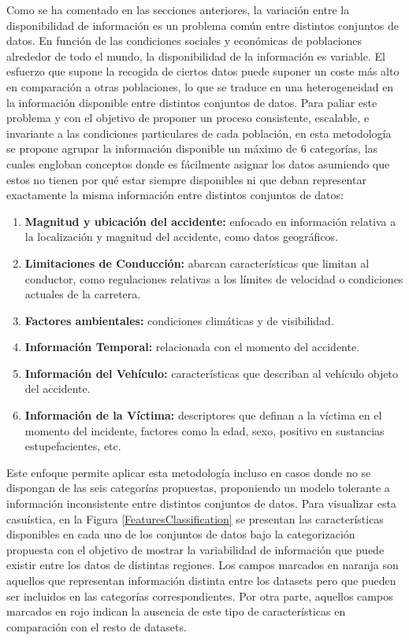 \documentclass{uathesis-es}
\begin{document}
{%

Como se ha comentado en las secciones anteriores, la variación entre la disponibilidad de información es un problema común entre distintos conjuntos de datos. En función de las condiciones sociales y económicas de poblaciones alrededor de todo el mundo, la disponibilidad de la información es variable. El esfuerzo que supone la recogida de ciertos datos puede suponer un coste más alto en comparación a otras poblaciones, lo que se traduce en una heterogeneidad en la información disponible entre distintos conjuntos de datos. Para paliar este problema y con el objetivo de proponer un proceso consistente, escalable, e invariante a las condiciones particulares de cada población, en esta metodología se propone agrupar la información disponible un máximo de 6 categorías, las cuales engloban conceptos donde es fácilmente asignar los datos asumiendo que estos no tienen por qué estar siempre disponibles ni que deban representar exactamente la misma información entre distintos conjuntos de datos:

\begin{enumerate}
    \item \textbf{Magnitud y ubicación del accidente:} enfocado en información relativa a la localización y magnitud del accidente, como datos geográficos.
    \item \textbf{Limitaciones de Conducción:} abarcan características que limitan al conductor, como regulaciones relativas a los límites de velocidad o condiciones actuales de la carretera.
    \item \textbf{Factores ambientales:} condiciones climáticas y de visibilidad.
    \item \textbf{Información Temporal:} relacionada con el momento del accidente.
    \item \textbf{Información del Vehículo:} características que describan al vehículo objeto del accidente.
    \item \textbf{Información de la Víctima:} descriptores que definan a la víctima en el momento del incidente, factores como la edad, sexo, positivo en sustancias estupefacientes, etc.
\end{enumerate}

Este enfoque permite aplicar esta metodología incluso en casos donde no se dispongan de las seis categorías propuestas, proponiendo un modelo tolerante a información inconsistente entre distintos conjuntos de datos. Para visualizar esta casuística, en la Figura \ref{FeaturesClassification} se presentan las características disponibles en cada uno de los conjuntos de datos bajo la categorización propuesta con el objetivo de mostrar la variabilidad de información que puede existir entre los datos de distintas regiones. Los campos marcados en naranja son aquellos que representan información distinta entre los datasets pero que pueden ser incluidos en las categorías correspondientes. Por otra parte, aquellos campos marcados en rojo indican la ausencia de este tipo de características en comparación con el resto de datasets.

}
\end{document}
